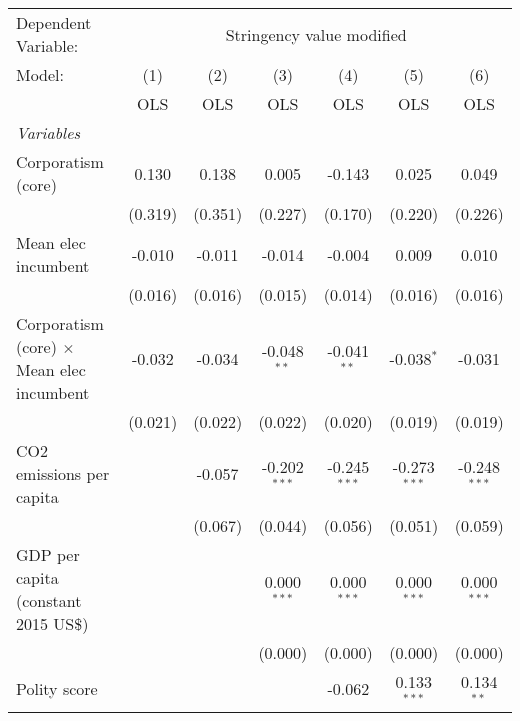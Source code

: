 
\begingroup
\centering
\begin{tabular}{lcccccc}
   \toprule
   Dependent Variable: & \multicolumn{6}{c}{Stringency value modified}\\
   Model:                                           & (1)     & (2)     & (3)            & (4)            & (5)            & (6)\\  
                                                    &  OLS    & OLS     & OLS            & OLS            & OLS            & OLS\\  
   \midrule
   \emph{Variables}\\
   Corporatism (core)                               & 0.130   & 0.138   & 0.005          & -0.143         & 0.025          & 0.049\\   
                                                    & (0.319) & (0.351) & (0.227)        & (0.170)        & (0.220)        & (0.226)\\   
   Mean elec incumbent                              & -0.010  & -0.011  & -0.014         & -0.004         & 0.009          & 0.010\\   
                                                    & (0.016) & (0.016) & (0.015)        & (0.014)        & (0.016)        & (0.016)\\   
   Corporatism (core) $\times$ Mean elec incumbent  & -0.032  & -0.034  & -0.048$^{**}$  & -0.041$^{**}$  & -0.038$^{*}$   & -0.031\\   
                                                    & (0.021) & (0.022) & (0.022)        & (0.020)        & (0.019)        & (0.019)\\   
   CO2 emissions per capita                         &         & -0.057  & -0.202$^{***}$ & -0.245$^{***}$ & -0.273$^{***}$ & -0.248$^{***}$\\   
                                                    &         & (0.067) & (0.044)        & (0.056)        & (0.051)        & (0.059)\\   
   GDP per capita (constant 2015 US\$)              &         &         & 0.000$^{***}$  & 0.000$^{***}$  & 0.000$^{***}$  & 0.000$^{***}$\\   
                                                    &         &         & (0.000)        & (0.000)        & (0.000)        & (0.000)\\   
   Polity score                                     &         &         &                & -0.062         & 0.133$^{***}$  & 0.134$^{**}$\\   

\end{tabular}
